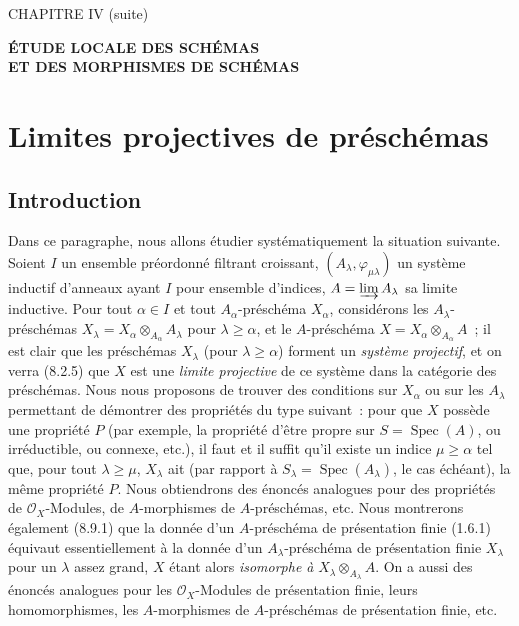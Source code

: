 \clearpage
\thispagestyle{plain}
\label{chapter:IV3-fr}

\begin{center}
{\large CHAPITRE IV (suite)\par}
\vspace{1.5em}
{\Large\bfseries ÉTUDE LOCALE DES SCHÉMAS\\
ET DES MORPHISMES DE SCHÉMAS\par}
\end{center}

\setcounter{section}{7}
\section{Limites projectives de préschémas}
\label{section:IV.8-fr}

\setcounter{subsection}{0}
\subsection{Introduction}
\label{subsection:IV.8.1-fr}

\begin{env}[8.1.1]
\label{IV.8.1.1-fr}
Dans ce paragraphe, nous allons étudier systématiquement la situation
suivante. Soient $I$ un ensemble préordonné filtrant croissant,
$(A_\lambda,\varphi_{\mu\lambda})$ un système inductif d'anneaux ayant $I$
pour ensemble d'indices, $A=\varinjlim A_\lambda$ sa limite inductive. Pour
tout $\alpha\in I$ et tout $A_\alpha$-préschéma $X_\alpha$, considérons les
$A_\lambda$-préschémas
$X_\lambda=X_\alpha\otimes_{A_\alpha}A_\lambda$ pour $\lambda\geq\alpha$,
et le $A$-préschéma $X=X_\alpha\otimes_{A_\alpha}A$~; il est clair que les
préschémas $X_\lambda$ (pour $\lambda\geq\alpha$) forment un \emph{système
projectif}, et on verra (8.2.5) que $X$ est une \emph{limite projective} de ce
système dans la catégorie des préschémas. Nous nous proposons de trouver des
conditions sur $X_\alpha$ ou sur les $A_\lambda$ permettant de démontrer des
propriétés du type suivant~: pour que $X$ possède une propriété $P$ (par
exemple, la propriété d'être propre sur $S=\operatorname{Spec}(A)$, ou
irréductible, ou connexe, etc.), il faut et il suffit qu'il existe un indice
$\mu\geq\alpha$ tel que, pour tout $\lambda\geq\mu$, $X_\lambda$ ait (par
rapport à $S_\lambda=\operatorname{Spec}(A_\lambda)$, le cas échéant), la
même propriété $P$. Nous obtiendrons des énoncés analogues pour des propriétés
de $\mathcal O_X$-Modules, de $A$-morphismes de $A$-préschémas, etc. Nous
montrerons également (8.9.1) que la donnée d'un $A$-préschéma de présentation
finie (1.6.1) équivaut essentiellement à la donnée d'un $A_\lambda$-préschéma
de présentation finie $X_\lambda$ pour un $\lambda$ assez grand, $X$ étant
alors \emph{isomorphe à} $X_\lambda\otimes_{A_\lambda}A$. On a aussi des
énoncés analogues pour les $\mathcal O_X$-Modules de présentation finie,
leurs homomorphismes, les $A$-morphismes de $A$-préschémas de présentation
finie, etc.
\end{env}


